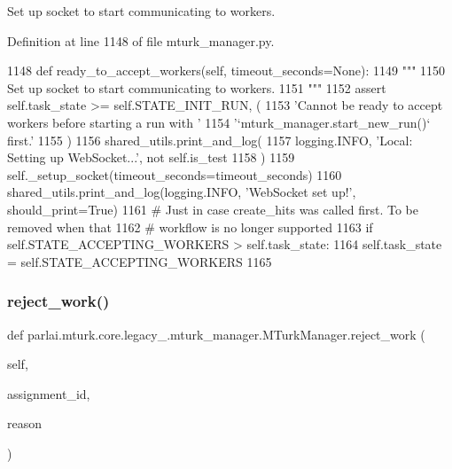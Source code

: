 \begin{DoxyVerb}Set up socket to start communicating to workers.
\end{DoxyVerb}
 

Definition at line 1148 of file mturk\+\_\+manager.\+py.


\begin{DoxyCode}
1148     \textcolor{keyword}{def }ready\_to\_accept\_workers(self, timeout\_seconds=None):
1149         \textcolor{stringliteral}{"""}
1150 \textcolor{stringliteral}{        Set up socket to start communicating to workers.}
1151 \textcolor{stringliteral}{        """}
1152         \textcolor{keyword}{assert} self.task\_state >= self.STATE\_INIT\_RUN, (
1153             \textcolor{stringliteral}{'Cannot be ready to accept workers before starting a run with '}
1154             \textcolor{stringliteral}{'`mturk\_manager.start\_new\_run()` first.'}
1155         )
1156         shared\_utils.print\_and\_log(
1157             logging.INFO, \textcolor{stringliteral}{'Local: Setting up WebSocket...'}, \textcolor{keywordflow}{not} self.is\_test
1158         )
1159         self.\_setup\_socket(timeout\_seconds=timeout\_seconds)
1160         shared\_utils.print\_and\_log(logging.INFO, \textcolor{stringliteral}{'WebSocket set up!'}, should\_print=\textcolor{keyword}{True})
1161         \textcolor{comment}{# Just in case create\_hits was called first. To be removed when that}
1162         \textcolor{comment}{# workflow is no longer supported}
1163         \textcolor{keywordflow}{if} self.STATE\_ACCEPTING\_WORKERS > self.task\_state:
1164             self.task\_state = self.STATE\_ACCEPTING\_WORKERS
1165 
\end{DoxyCode}
\mbox{\label{classparlai_1_1mturk_1_1core_1_1legacy__2018_1_1mturk__manager_1_1MTurkManager_a48dc4a43d5ad927bac268686a2c58aca}} 
\subsubsection{\texorpdfstring{reject\+\_\+work()}{reject\_work()}}
{\footnotesize\ttfamily def parlai.\+mturk.\+core.\+legacy\+\_.\+mturk\+\_\+manager.\+M\+Turk\+Manager.\+reject\+\_\+work (\begin{DoxyParamCaption}\item[{}]{self,  }\item[{}]{assignment\+\_\+id,  }\item[{}]{reason }\end{DoxyParamCaption})}


